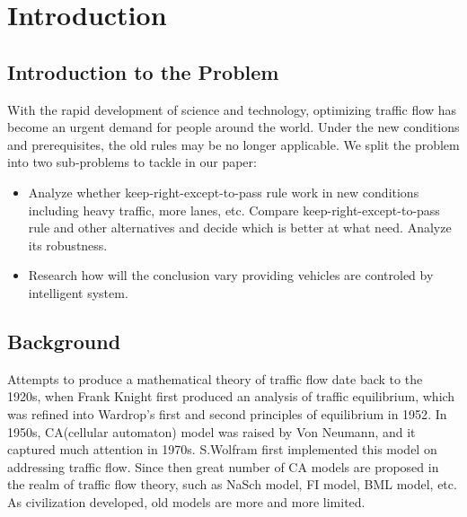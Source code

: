 \section{Introduction}
\subsection{Introduction to the Problem}
With the rapid development of science and technology, optimizing traffic flow has become an urgent demand for people around the world. 
Under the new conditions and prerequisites, the old rules may be no longer applicable. 
We split the problem into two sub-problems to tackle in our paper: 
\begin{itemize}
\item Analyze whether keep-right-except-to-pass rule work in new conditions including heavy traffic, more lanes, etc. 
Compare keep-right-except-to-pass rule and other alternatives and decide which is better at what need. 
Analyze its robustness. 
\item Research how will the conclusion vary providing vehicles are controled by intelligent system. 
\end{itemize}
\subsection{Background}
Attempts to produce a mathematical theory of traffic flow date back to the 1920s, when Frank Knight first produced an analysis of traffic equilibrium, which was refined into Wardrop's first and second principles of equilibrium in 1952\cite{trafficflowhistory}. 
In 1950s, CA(cellular automaton) model was raised by Von Neumann, and it captured much attention in 1970s. 
S.Wolfram first implemented this model on addressing traffic flow\cite{1983RvMP...55..601W}. 
Since then great number of CA models are proposed in the realm of traffic flow theory, such as NaSch model, FI model, BML model, etc. 
As civilization developed, old models are more and more limited. 

